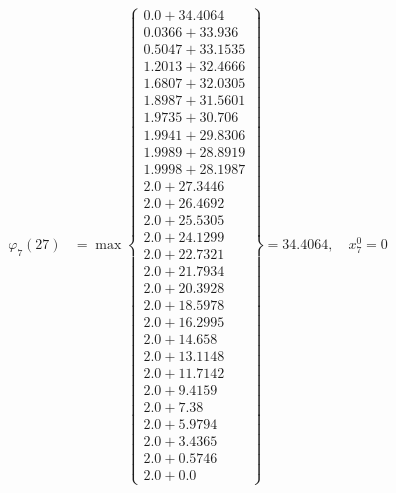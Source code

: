 \documentclass{article}
\begin{document}
\begin{align*}
  
\varphi_{7}(27) &= \max \left\{ \begin{array}{c}
0.0 + 34.4064 \\
 0.0366 + 33.936 \\
 0.5047 + 33.1535 \\
 1.2013 + 32.4666 \\
 1.6807 + 32.0305 \\
 1.8987 + 31.5601 \\
 1.9735 + 30.706 \\
 1.9941 + 29.8306 \\
 1.9989 + 28.8919 \\
 1.9998 + 28.1987 \\
 2.0 + 27.3446 \\
 2.0 + 26.4692 \\
 2.0 + 25.5305 \\
 2.0 + 24.1299 \\
 2.0 + 22.7321 \\
 2.0 + 21.7934 \\
 2.0 + 20.3928 \\
 2.0 + 18.5978 \\
 2.0 + 16.2995 \\
 2.0 + 14.658 \\
 2.0 + 13.1148 \\
 2.0 + 11.7142 \\
 2.0 + 9.4159 \\
 2.0 + 7.38 \\
 2.0 + 5.9794 \\
 2.0 + 3.4365 \\
 2.0 + 0.5746 \\
 2.0 + 0.0
\end{array} \right\}=34.4064,\quad x_{7}^0=0\\
  
  
  

\end{align*}
\end{document}
